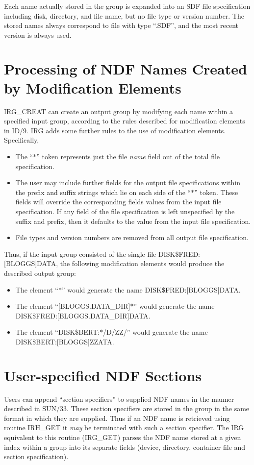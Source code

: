 Each name actually stored in the group is expanded into an SDF file
specification including disk, directory, and file name, but no file type or 
version number. The stored names always correspond to file with type ``.SDF'', 
and the most recent version is always used.


\section {Processing of NDF Names Created by Modification Elements}
IRG\_CREAT can create an output group by modifying each name within a specified 
input group, according to the rules described for modification elements in ID/9.
IRG adds some further rules to the use of modification elements. Specifically,
\begin{itemize}
\item The ``$*$'' token represents just the file {\em name} field out of the 
total file specification.
\item The user may include further fields for the output file specifications 
within the prefix and suffix strings which lie on each side of the ``$*$'' 
token. These fields will override the corresponding fields values from the input 
file specification. If any field of the file specification is left unspecified 
by the suffix and prefix, then it defaults to the value from the input file 
specification.
\item File types and version numbers are removed from all output file specification.
\end{itemize}

Thus, if the input group consisted of the single file 
DISK\$FRED:[BLOGGS]DATA, the following modification elements would 
produce the described output group:

\begin{itemize}
\item The element ``$*$'' would generate the name DISK\$FRED:[BLOGGS]DATA.
\item The element ``[BLOGGS.DATA\_DIR]$*$'' would generate the name 
DISK\$FRED:[BLOGGS.DATA\_DIR]DATA.
\item The element ``DISK\$BERT:$*$/D/ZZ/'' would generate the name 
DISK\$BERT:[BLOGGS]ZZATA.
\end{itemize}

\section {User-specified NDF Sections}
Users can append ``section specifiers'' to supplied NDF names in the manner
described in SUN/33. These section specifiers are stored in the group in the
same format in which they are supplied. Thus if an NDF name is retrieved using
routine IRH\_GET it {\em may} be terminated with such a section specifier. The
IRG equivalent to this routine (IRG\_GET) parses the NDF name stored at a given
index within a group into its separate fields (device, directory, container file
and section specification).

